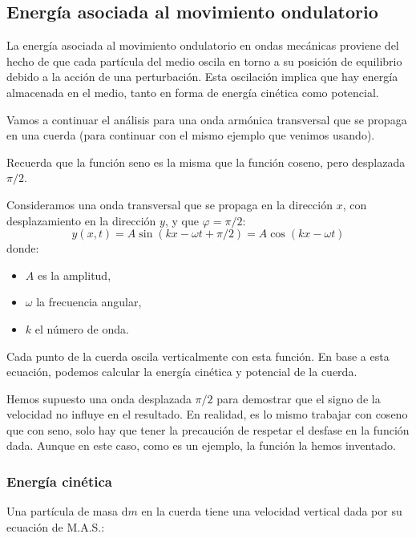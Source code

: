 \subsection{Energía asociada al movimiento ondulatorio}

La energía asociada al movimiento ondulatorio en ondas mecánicas proviene del hecho de que cada partícula del medio oscila en torno a su posición de equilibrio debido a la acción de una perturbación. Esta oscilación implica que hay energía almacenada en el medio, tanto en forma de energía cinética como potencial.

Vamos a continuar el análisis para una onda armónica transversal que se propaga en una cuerda (para continuar con el mismo ejemplo que venimos usando). 

\begin{tcolorbox}[myconclusion]
  Recuerda que la función seno es la misma que la función coseno, pero desplazada \(\pi/2\).
\end{tcolorbox}

Consideramos una onda transversal que se propaga en la dirección \(x\), con desplazamiento en la dirección \(y\), y que \(\varphi = \pi/2\):
\[
y(x,t) = A \sin(kx - \omega t + \pi/2) = \boxed{A \cos(kx - \omega t)}
\]
donde:
\begin{itemize}
  \item \(A\) es la amplitud,
  \item \(\omega\) la frecuencia angular,
  \item \(k\) el número de onda.
\end{itemize}

Cada punto de la cuerda oscila verticalmente con esta función. En base a esta ecuación, podemos calcular la energía cinética y potencial de la cuerda.

\begin{tcolorbox}[myconclusion]
  Hemos supuesto una onda desplazada \(\pi/2\) para demostrar que el signo de la velocidad no influye en el resultado. En realidad, es lo mismo trabajar con coseno que con seno, solo hay que tener la precaución de respetar el desfase en la función dada. Aunque en este caso, como es un ejemplo, la función la hemos inventado.
\end{tcolorbox}

\subsubsection{Energía cinética}

Una partícula de masa \(\mathrm{d}m\) en la cuerda tiene una velocidad vertical dada por su ecuación de M.A.S.:


